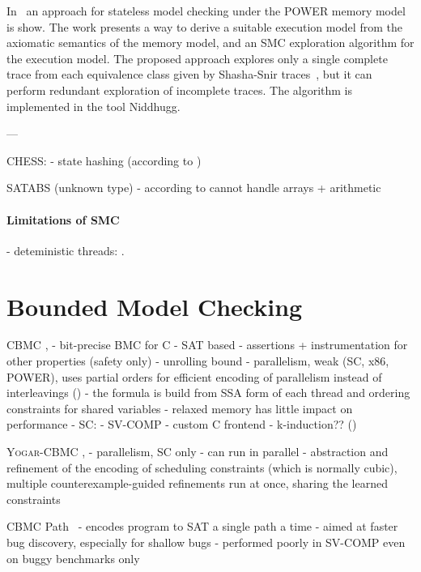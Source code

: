 
In~\cite{Abdulla2016} an approach for stateless model checking under the POWER memory model is show.
The work presents a way to derive a suitable execution model from the axiomatic semantics of the memory model, and an SMC exploration algorithm for the execution model.
The proposed approach explores only a single complete trace from each equivalence class given by Shasha-Snir traces~\cite{Shasha1988}, but it can perform redundant exploration of incomplete traces. 
The algorithm is implemented in the tool Niddhugg.


---

CHESS:
- state hashing (according to \cite{Cordeiro2011})


SATABS (unknown type)
- according to \cite{Cordeiro2011} cannot handle arrays + arithmetic



\paragraph{Limitations of SMC}

- deteministic threads: \cite{Huang2015:14,Huang2015:27}.


\section{Bounded Model Checking}


CBMC \cite{Kroening2014}, \cite{Clarke2004}
- bit-precise BMC for C
- SAT based
- assertions + instrumentation for other properties (safety only)
- unrolling bound
- parallelism, weak (SC, x86, POWER), uses partial orders  for efficient encoding of parallelism \cite{Alglave2013por} instead of interleavings ()
  - the formula is build from SSA form of each thread and ordering constraints for shared variables
- relaxed memory has little impact on performance
- SC: \cite{Alglave2013por:25}
- SV-COMP
- custom C frontend
- k-induction?? (\cite{Gadelha2018:7})

\textsc{Yogar-CBMC} \cite{Yin2018}, \cite{Yin2019}
- parallelism, SC only
- can run in parallel
- abstraction and refinement of the encoding of scheduling constraints (which is normally cubic), multiple counterexample-guided refinements run at once, sharing the learned constraints

CBMC Path~\cite{Khazem2019}
- encodes program to SAT a single path a time
- aimed at faster bug discovery, especially for shallow bugs
- performed poorly in SV-COMP even on buggy benchmarks only

